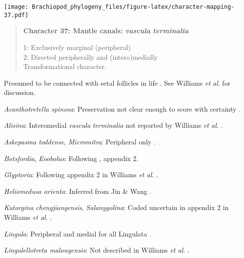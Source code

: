 \documentclass[openany]{book}
\theoremstyle{definition}
\theoremstyle{definition}
\theoremstyle{definition}
\theoremstyle{remark}
\begin{document}
\texttt{[image: Brachiopod\_phylogeny\_files/figure-latex/character-mapping-37.pdf]}

\begin{quote}
\textbf{Character 37: Mantle canals: \emph{vascula} \emph{terminalia}}

1: Exclusively marginal (peripheral)\\
2: Directed peripherally and (intero)medially\\
Transformational character.
\end{quote}

Presumed to be connected with setal follicles in life
\citep{Williams1998Thediversity}. See Williams \emph{et al}.
\citeyearpar{Williams2000LinguliformeaCraniiformea} for discussion.

\hypertarget{Acanthotretella_spinosa-coding-37}{}
\emph{Acanthotretella spinosa}: Preservation not clear enough to score
with certainty \citep{Holmer2006Aspinose}.

\hypertarget{Alisina-coding-37}{}
\emph{Alisina}: Interomedial \emph{vascula} \emph{terminalia} not
reported by Williams \emph{et al}.
\citeyearpar{Williams2000LinguliformeaCraniiformea}.

\hypertarget{Askepasma_toddense-coding-37}{}
\emph{Askepasma toddense}, \emph{Micromitra}: Peripheral only
\citep{Williams1998Thediversity, Williams2000LinguliformeaCraniiformea}.

\hypertarget{Botsfordia-coding-37}{}
\emph{Botsfordia}, \emph{Eoobolus}: Following
\citet{Williams1998Thediversity}, appendix 2.

\hypertarget{Glyptoria-coding-37}{}
\emph{Glyptoria}: Following appendix 2 in Williams \emph{et al}.
\citeyearpar{Williams1998Thediversity}.

\hypertarget{Heliomedusa_orienta-coding-37}{}
\emph{Heliomedusa orienta}: Inferred from Jin \& Wang
\citeyearpar{Jin1992Revisionof}.

\hypertarget{Kutorgina_chengjiangensis-coding-37}{}
\emph{Kutorgina chengjiangensis}, \emph{Salanygolina}: Coded uncertain
in appendix 2 in Williams \emph{et al}.
\citeyearpar{Williams1998Thediversity}.

\hypertarget{Lingula-coding-37}{}
\emph{Lingula}: Peripheral and medial for all Lingulata
\citep{Williams2000LinguliformeaCraniiformea}.

\hypertarget{Lingulellotreta_malongensis-coding-37}{}
\emph{Lingulellotreta malongensis}: Not described in Williams \emph{et
al}. \citeyearpar{Williams2000LinguliformeaCraniiformea}.
\end{document}
